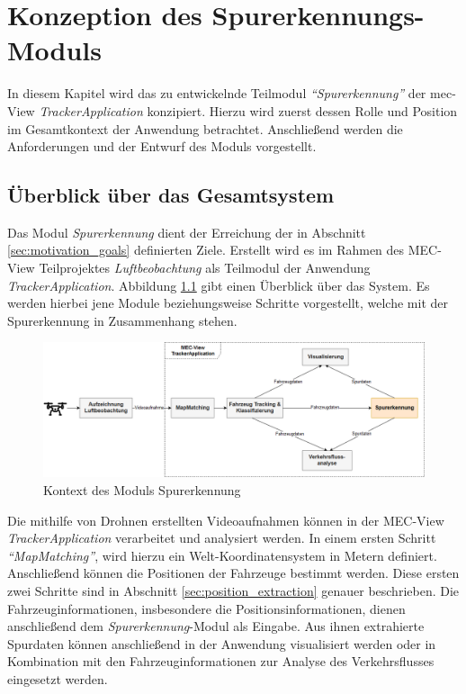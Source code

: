 
\chapter{Konzeption des Spurerkennungs-Moduls}
\label{cha:konzeption}

In diesem Kapitel wird das zu entwickelnde Teilmodul \textit{``Spurerkennung''}
der \acrshort*{mec}-View \textit{TrackerApplication} konzipiert. Hierzu wird zuerst dessen Rolle und Position im Gesamtkontext
der Anwendung betrachtet. Anschließend werden die Anforderungen und der Entwurf des Moduls vorgestellt.

\section{Überblick über das Gesamtsystem}

Das Modul \textit{Spurerkennung} dient der Erreichung der in Abschnitt
\ref{sec:motivation_goals} definierten Ziele. Erstellt wird es im Rahmen des MEC-View Teilprojektes
\textit{Luftbeobachtung} als Teilmodul der Anwendung \textit{TrackerApplication}.
Abbildung \ref{fig:concept_laneDetection_context} gibt einen Überblick über das System.
Es werden hierbei jene Module beziehungsweise Schritte vorgestellt, welche mit der Spurerkennung in
Zusammenhang stehen.

\begin{figure}[H]
    \centering
    \includegraphics[width=\linewidth]{resources/img/konzeption/Context_LaneDetection}
    \caption{Kontext des Moduls Spurerkennung}
    \label{fig:concept_laneDetection_context}
\end{figure}

Die mithilfe von Drohnen erstellten Videoaufnahmen können in der MEC-View \textit{TrackerApplication}
verarbeitet und analysiert werden. In einem ersten Schritt \textit{``MapMatching''}, wird hierzu
ein Welt-Koordinatensystem in Metern definiert. Anschließend können die Positionen
der Fahrzeuge bestimmt werden. Diese ersten zwei Schritte sind in Abschnitt \ref{sec:position_extraction} genauer beschrieben.
Die Fahrzeuginformationen, insbesondere die Positionsinformationen, dienen anschließend dem \textit{Spurerkennung}-Modul
als Eingabe. Aus ihnen extrahierte Spurdaten können anschließend in der Anwendung visualisiert werden oder in Kombination
mit den Fahrzeuginformationen zur Analyse des Verkehrsflusses eingesetzt werden.


